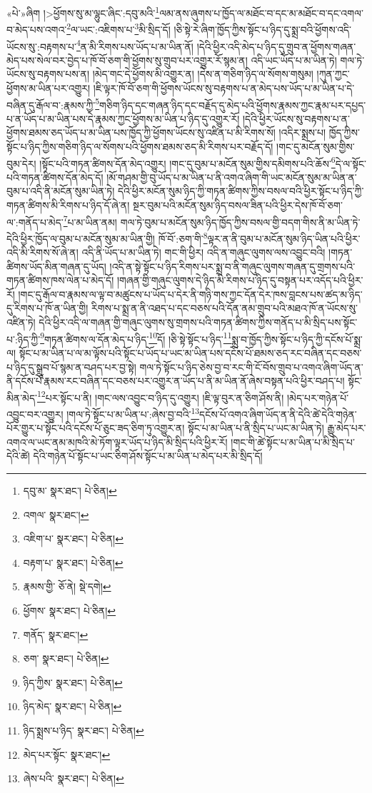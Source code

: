 «པེ་»ཞིག །>ཕྱོགས་སུ་མ་ལྷུང་ཞིང་:དབུ་མའི་\footnote{དབུ་མ་  སྣར་ཐང་།  པེ་ཅིན། }ལམ་ནས་ཞུགས་པ་ཁྱོད་ལ་མཐོང་བ་དང་མ་མཐོང་བ་དང་འགལ་བ་མེད་པས་འགའ་\footnote{འགལ་  སྣར་ཐང་། }ལ་ཡང་:འཇིགས་པ་\footnote{འཇིག་པ་  སྣར་ཐང་།  པེ་ཅིན། }མི་སྲིད་དོ། །ཅི་སྟེ་རེ་ཞིག་ཁྱོད་ཀྱིས་སྟོང་པ་ཉིད་དུ་སྨྲ་བའི་ཕྱོགས་འདི་ཡོངས་སུ་:བརྟགས་པ་\footnote{བརྟག་པ་  སྣར་ཐང་།  པེ་ཅིན། }ན་མི་རིགས་པས་ཡོད་པ་མ་ཡིན་ནོ། །དེའི་ཕྱིར་འདི་མེད་པ་ཉིད་དུ་གྲུབ་ན་ཕྱོགས་གཞན་མེད་པས་སེལ་བར་བྱེད་པ་ཁོ་བོ་ཅག་གི་ཕྱོགས་སུ་གྲུབ་པར་འགྱུར་རོ་སྙམ་ན། འདི་ཡང་ཡོད་པ་མ་ཡིན་ཏེ། གལ་ཏེ་ཡོངས་སུ་བརྟགས་པས་ན། །མེད་གང་དེ་ཕྱོགས་མི་འགྱུར་ན། །དེས་ན་གཅིག་ཉིད་ལ་སོགས་གསུམ། །ཀུན་ཀྱང་ཕྱོགས་མ་ཡིན་པར་འགྱུར། །ཇི་ལྟར་ཁོ་བོ་ཅག་གི་ཕྱོགས་ཡོངས་སུ་བརྟགས་པ་ན་མེད་པས་ཡོད་པ་མ་ཡིན་པ་དེ་བཞིན་དུ་རྒོལ་བ་:རྣམས་ཀྱི་\footnote{རྣམས་གྱི་  ཅོ་ནེ།  སྡེ་དགེ། }གཅིག་ཉིད་དང་གཞན་ཉིད་དང་བརྗོད་དུ་མེད་པའི་ཕྱོགས་རྣམས་ཀྱང་རྣམ་པར་དཔྱད་པ་ན་ཡོད་པ་མ་ཡིན་པས་དེ་རྣམས་ཀྱང་ཕྱོགས་མ་ཡིན་པ་ཉིད་དུ་འགྱུར་རོ། །དེའི་ཕྱིར་ཡོངས་སུ་བརྟགས་པ་ན་ཕྱོགས་ཐམས་ཅད་ཡོད་པ་མ་ཡིན་པས་ཁྱོད་ཀྱི་ཕྱོགས་ཡོངས་སུ་འཛིན་པ་མི་རིགས་སོ། །འདིར་སྨྲས་པ། ཁྱོད་ཀྱིས་སྟོང་པ་ཉིད་ཀྱིས་གཅིག་ཉིད་ལ་སོགས་པའི་ཕྱོགས་ཐམས་ཅད་མི་རིགས་པར་བརྗོད་དོ། །གང་དུ་མངོན་སུམ་གྱིས་བུམ་དེར། །སྟོང་པའི་གཏན་ཚིགས་དོན་མེད་འགྱུར། །གང་དུ་བུམ་པ་མངོན་སུམ་གྱིས་དམིགས་པའི་ཆོས་\footnote{ཕྱོགས་  སྣར་ཐང་།  པེ་ཅིན། }དེ་ལ་སྟོང་པའི་གཏན་ཚིགས་དོན་མེད་དོ། །མོ་གཤམ་གྱི་བུ་ཡོད་པ་མ་ཡིན་པ་ནི་འགའ་ཞིག་གི་ཡང་མངོན་སུམ་མ་ཡིན་ན་བུམ་པ་འདི་ནི་མངོན་སུམ་ཡིན་ཏེ། དེའི་ཕྱིར་མངོན་སུམ་ཉིད་ཀྱི་གཏན་ཚིགས་ཀྱིས་བསལ་བའི་ཕྱིར་སྟོང་པ་ཉིད་ཀྱི་གཏན་ཚིགས་མི་རིགས་པ་ཉིད་དོ་ཞེ་ན། སྔར་བུམ་པའི་མངོན་སུམ་ཉིད་བསལ་ཟིན་པའི་ཕྱིར་དེས་ཁོ་བོ་ཅག་ལ་:གནོད་པ་མེད་\footnote{གནོད་  སྣར་ཐང་། }པ་མ་ཡིན་ནམ། གལ་ཏེ་བུམ་པ་མངོན་སུམ་ཉིད་ཁྱོད་ཀྱིས་བསལ་གྱི་བདག་གིས་ནི་མ་ཡིན་ཏེ་དེའི་ཕྱིར་ཁྱོད་ལ་བུམ་པ་མངོན་སུམ་མ་ཡིན་གྱི། ཁོ་བོ་:ཅག་གི་\footnote{ཅག་  སྣར་ཐང་།  པེ་ཅིན། }ལྟར་ན་ནི་བུམ་པ་མངོན་སུམ་ཉིད་ཡིན་པའི་ཕྱིར་འདི་མི་རིགས་སོ་ཞེ་ན། འདི་ནི་ཡོད་པ་མ་ཡིན་ཏེ། གང་གི་ཕྱིར། འདི་ན་གཞུང་ལུགས་ལས་འབྱུང་བའི། །གཏན་ཚིགས་ཡོད་མིན་གཞན་དུ་ཡོད། །འདི་ན་སྟེ་སྟོང་པ་ཉིད་རིགས་པར་སྨྲ་བ་ནི་གཞུང་ལུགས་གཞན་དུ་གྲགས་པའི་གཏན་ཚིགས་ཁས་ལེན་པ་མེད་དོ། །གཞན་གྱི་གཞུང་ལུགས་དེ་ཉིད་མི་རིགས་པ་ཉིད་དུ་བསྟན་པར་འདོད་པའི་ཕྱིར་རོ། །གང་དུ་རྒོལ་བ་རྣམས་ལ་ལྟ་བ་མཚུངས་པ་ཡོད་པ་དེར་ནི་གཉི་གས་ཀྱང་དོན་དེར་ཁས་བླངས་པས་ཚད་མ་ཉིད་དུ་རིགས་པ་ཁོ་ན་ཡིན་གྱི། རིགས་པ་སྨྲ་ན་ནི་འཐད་པ་དང་བཅས་པའི་དོན་ནམ་གྲུབ་པའི་མཐའ་ཁོ་ན་ཡོངས་སུ་འཛིན་ཏེ། དེའི་ཕྱིར་འདི་ལ་གཞན་གྱི་གཞུང་ལུགས་སུ་གྲགས་པའི་གཏན་ཚིགས་ཀྱིས་གནོད་པ་མི་སྲིད་པས་སྟོང་པ་:ཉིད་ཀྱི་\footnote{ཉིད་ཀྱིས་  སྣར་ཐང་།  པེ་ཅིན། }གཏན་ཚིགས་ལ་དོན་མེད་པ་ཉིད་\footnote{ཉིད་མེད་  སྣར་ཐང་།  པེ་ཅིན། }དོ། །ཅི་སྟེ་སྟོང་པ་ཉིད་\footnote{ཉིད་སྨྲས་པ་ཉིད་  སྣར་ཐང་།  པེ་ཅིན། }སྨྲ་བ་ཁྱོད་ཀྱིས་སྟོང་པ་ཉིད་ཀྱི་དངོས་པོ་སྨྲ་ལ། སྟོང་པ་མ་ཡིན་པ་ལ་མ་ལྟོས་པའི་སྟོང་པ་ཡོད་པ་ཡང་མ་ཡིན་པས་དངོས་པོ་ཐམས་ཅད་རང་བཞིན་དང་བཅས་པ་ཉིད་དུ་སྒྲུབ་པོ་སྙམ་ན་བཤད་པར་བྱ་སྟེ། གལ་ཏེ་སྟོང་པ་ཉིད་ཅེས་བྱ་བ་རང་གི་ངོ་བོས་གྲུབ་པ་འགའ་ཞིག་ཡོད་ན་ནི་དངོས་པོ་རྣམས་རང་བཞིན་དང་བཅས་པར་འགྱུར་ན་ཡོད་པ་ནི་མ་ཡིན་ནོ་ཞེས་བསྟན་པའི་ཕྱིར་བཤད་པ། སྟོང་མིན་མེད་\footnote{མེད་པར་སྟོང་  སྣར་ཐང་། }པར་སྟོང་པ་ནི། །གང་ལས་འབྱུང་བ་ཉིད་དུ་འགྱུར། །ཇི་ལྟ་བུར་ན་ཅིག་ཤོས་ནི། །མེད་པར་གཉེན་པོ་འབྱུང་བར་འགྱུར། །གལ་ཏེ་སྟོང་པ་མ་ཡིན་པ་:ཞེས་བྱ་བའི་\footnote{ཞེས་པའི་  སྣར་ཐང་།  པེ་ཅིན། }དངོས་པོ་འགའ་ཞིག་ཡོད་ན་ནི་དེའི་ཚེ་དེའི་གཉེན་པོར་གྱུར་པ་སྟོང་པའི་དངོས་པོ་ཅུང་ཟད་ཅིག་ཏུ་འགྱུར་ན། སྟོང་པ་མ་ཡིན་པ་ནི་སྲིད་པ་ཡང་མ་ཡིན་ཏེ། རྒྱུ་མེད་པར་འགའ་ལ་ཡང་ནམ་མཁའི་མེ་ཏོག་ལྟར་ཡོད་པ་ཉིད་མི་སྲིད་པའི་ཕྱིར་རོ། །གང་གི་ཚེ་སྟོང་པ་མ་ཡིན་པ་མི་སྲིད་པ་དེའི་ཚེ། དེའི་གཉེན་པོ་སྟོང་པ་ཡང་ཅིག་ཤོས་སྟོང་པ་མ་ཡིན་པ་མེད་པར་མི་སྲིད་དོ། 